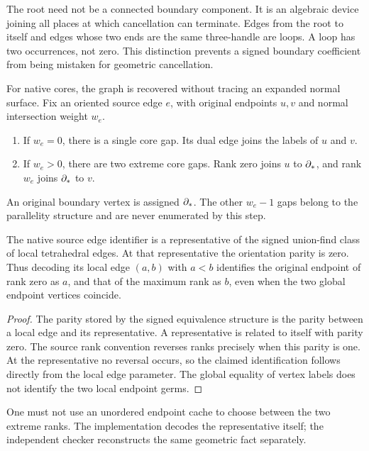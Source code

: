 The root need not be a connected boundary component.  It is an algebraic
device joining all places at which cancellation can terminate.  Edges from
the root to itself and edges whose two ends are the same three-handle are
loops.  A loop has two occurrences, not zero.  This distinction prevents a
signed boundary coefficient from being mistaken for geometric cancellation.

For native cores, the graph is recovered without tracing an expanded normal
surface.  Fix an oriented source edge $e$, with original endpoints $u,v$ and
normal intersection weight $w_e$.
\begin{enumerate}
\item If $w_e=0$, there is a single core gap.  Its dual edge joins the labels
  of $u$ and $v$.
\item If $w_e>0$, there are two extreme core gaps.  Rank zero joins $u$ to
  $\partial_*$, and rank $w_e$ joins $\partial_*$ to $v$.
\end{enumerate}
An original boundary vertex is assigned $\partial_*$.  The other $w_e-1$ gaps
belong to the parallelity structure and are never enumerated by this step.

\begin{lemma}\label{lem:orientation}
The native source edge identifier is a representative of the signed
union-find class of local tetrahedral edges.  At that representative the
orientation parity is zero.  Thus decoding its local edge $(a,b)$ with
$a<b$ identifies the original endpoint of rank zero as $a$, and that of the
maximum rank as $b$, even when the two global endpoint vertices coincide.
\end{lemma}
\begin{proof}
The parity stored by the signed equivalence structure is the parity between
a local edge and its representative.  A representative is related to itself
with parity zero.  The source rank convention reverses ranks precisely when
this parity is one.  At the representative no reversal occurs, so the
claimed identification follows directly from the local edge parameter.
The global equality of vertex labels does not identify the two local endpoint
germs.
\end{proof}

One must not use an unordered endpoint cache to choose between the two
extreme ranks.  The implementation decodes the representative itself; the
independent checker reconstructs the same geometric fact separately.

